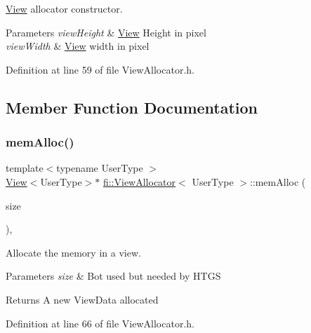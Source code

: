 \hyperlink{classfi_1_1View}{View} allocator constructor. 


\begin{DoxyParams}{Parameters}
{\em view\+Height} & \hyperlink{classfi_1_1View}{View} Height in pixel \\
\hline
{\em view\+Width} & \hyperlink{classfi_1_1View}{View} width in pixel \\
\hline
\end{DoxyParams}


Definition at line 59 of file View\+Allocator.\+h.



\subsection{Member Function Documentation}
\mbox{\label{classfi_1_1ViewAllocator_ac0744636f7f0b90054c13adf49af279b}} 
\subsubsection{\texorpdfstring{mem\+Alloc()}{memAlloc()}\hspace{0.1cm}{\footnotesize\ttfamily [1/2]}}
{\footnotesize\ttfamily template$<$typename User\+Type $>$ \\
\hyperlink{classfi_1_1View}{View}$<$User\+Type$>$$\ast$ \hyperlink{classfi_1_1ViewAllocator}{fi\+::\+View\+Allocator}$<$ User\+Type $>$\+::mem\+Alloc (\begin{DoxyParamCaption}\item[{size\+\_\+t}]{size }\end{DoxyParamCaption})\hspace{0.3cm}{\ttfamily [inline]}, {\ttfamily [override]}}



Allocate the memory in a view. 


\begin{DoxyParams}{Parameters}
{\em size} & Bot used but needed by H\+T\+GS \\
\hline
\end{DoxyParams}
\begin{DoxyReturn}{Returns}
A new View\+Data allocated 
\end{DoxyReturn}


Definition at line 66 of file View\+Allocator.\+h.

